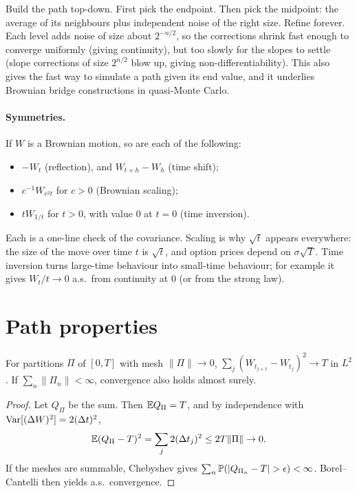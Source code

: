 \begin{intuition}
Build the path top-down. First pick the endpoint. Then pick the midpoint: the average of its neighbours plus independent noise of the right size. Refine forever. Each level adds noise of size about $2^{-n/2}$, so the corrections shrink fast enough to converge uniformly (giving continuity), but too slowly for the slopes to settle (slope corrections of size $2^{n/2}$ blow up, giving non-differentiability). This also gives the fast way to simulate a path given its end value, and it underlies Brownian bridge constructions in quasi-Monte Carlo.
\end{intuition}

\paragraph{Symmetries.} If $W$ is a Brownian motion, so are each of the following:
\begin{itemize}
\item $-W_t$ (reflection), and $W_{t+h}-W_h$ (time shift);
\item $c^{-1}W_{c^2t}$ for $c>0$ (Brownian scaling);
\item $tW_{1/t}$ for $t>0$, with value $0$ at $t=0$ (time inversion).
\end{itemize}
Each is a one-line check of the covariance. Scaling is why $\sqrt t$ appears everywhere: the size of the move over time $t$ is $\sqrt t$, and option prices depend on $\sigma\sqrt T$. Time inversion turns large-time behaviour into small-time behaviour; for example it gives $W_t/t\to0$ a.s.\ from continuity at $0$ (or from the strong law).

\section{Path properties}

\begin{theorem}\label{thm:qv}
For partitions $\Pi$ of $[0,T]$ with mesh $\|\Pi\|\to0$,
$
\sum_j(W_{t_{j+1}}-W_{t_j})^2\to T
$
in $L^2$. If $\sum_n\|\Pi_n\|<\infty$, convergence also holds almost surely.
\end{theorem}
\begin{proof}
Let $Q_\Pi$ be the sum. Then $\mathbb{E} Q_\Pi=T$, and by independence with $\operatorname{Var}[(\Delta W)^2]=2(\Delta t)^2$,
\[
\mathbb{E}(Q_\Pi-T)^2=\sum_j2(\Delta t_j)^2\le2T\|\Pi\|\to0.
\]
If the meshes are summable, Chebyshev gives $\sum_n\Prob(|Q_{\Pi_n}-T|>\epsilon)<\infty$. Borel--Cantelli then yields a.s.\ convergence.
\end{proof}

